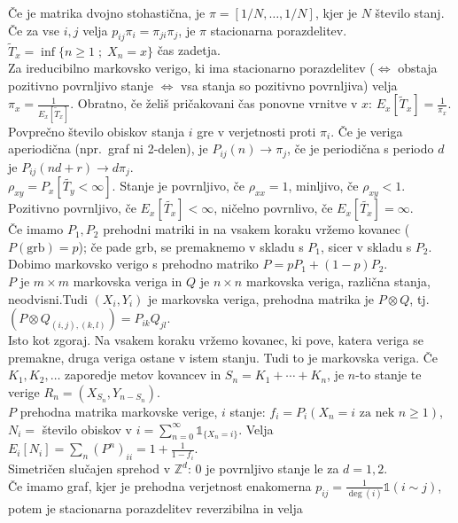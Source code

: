 \documentclass[a4paper, oneside, 12pt]{article}
\theoremstyle{definition}
\def\Z{\mathbb{Z}}
\newcommand{\ind}{\ensuremath{\mathbb{1}}}
\begin{document}
Če je matrika dvojno stohastična, je $\pi = [ 1/N, \ldots, 1/N]$, kjer je $N$ število stanj.\\
Če za vse $i,j$ velja $p_{ij} \pi_i = \pi_{ji} \pi_j$, je $\pi$ stacionarna porazdelitev.\\
$\tilde{T}_x = \inf \{n \geq 1 \; ; \; X_n = x\}$ čas zadetja.\\
Za ireducibilno markovsko verigo, ki ima stacionarno porazdelitev
($\iff$ obstaja pozitivno povrnljivo stanje $\iff$ vsa stanja so pozitivno povrnljiva)
velja $\pi_x = \frac{1}{E_x[\tilde{T}_x]}$. Obratno, če želiš pričakovani čas ponovne vrnitve v
$x$: $E_x[\tilde{T}_x] = \frac{1}{\pi_x}$. Povprečno število obiskov stanja $i$ gre v verjetnosti proti $\pi_i$. Če je veriga aperiodična (npr.\ graf ni 2-delen), je $P_{ij}(n) \to \pi_j$, če je periodična s periodo $d$ je $P_{ij}(nd + r) \to d \pi_j$.\\
$\rho_{xy} = P_x[\tilde{T_y} < \infty]$. Stanje je povrnljivo, če $\rho_{xx} = 1$, minljivo, če $\rho_{xy} < 1$. Pozitivno povrnljivo, če $E_x[\tilde{T_x}] < \infty$, ničelno povrnlivo, če $E_x[\tilde{T_x}] = \infty$.\\
Če imamo $P_1, P_2$ prehodni matriki in na vsakem koraku vržemo kovanec ($P(\text{grb}) = p$); če pade grb, se premaknemo v skladu s $P_1$, sicer v skladu s $P_2$. Dobimo markovsko verigo s prehodno matriko $P = p P_1 + (1-p) P_2$.\\
$P$ je $m\times m$ markovska veriga in $Q$ je $n \times n$ markovska veriga, različna stanja, neodvisni.Tudi $(X_i, Y_i)$ je markovska veriga, prehodna matrika je $P \otimes Q$, tj.\ $(P \otimes Q_{(i,j), (k,l)}) = P_{ik} Q_{jl}$.\\
Isto kot zgoraj. Na vsakem koraku vržemo kovanec, ki pove, katera veriga se premakne, druga veriga ostane v istem stanju. Tudi to je markovska veriga. Če $K_1, K_2, \ldots$ zaporedje metov kovancev in $S_n = K_1 + \cdots + K_n$, je $n$-to stanje te verige $R_n = (X_{S_n}, Y_{n-S_n})$.\\
$P$ prehodna matrika markovske verige, $i$ stanje: $f_i = P_i(X_n = i \text{ za nek } n \geq 1)$, $N_i = $ število obiskov v $i = \sum_{n=0}^\infty \mathbb{1}_{\{X_n = i\}}$. Velja $E_i[N_i] = \sum_n (P^n)_{i i} = 1 + \frac{1}{1-f_i}$.\\
Simetričen slučajen sprehod v $\Z^d$: $0$ je povrnljivo stanje le za $d = 1, 2$.\\
Če imamo graf, kjer je prehodna verjetnost enakomerna $p_{ij} = \frac{1}{\deg(i)} \ind(i\sim j)$,
potem je stacionarna porazdelitev reverzibilna in velja
\end{document}
